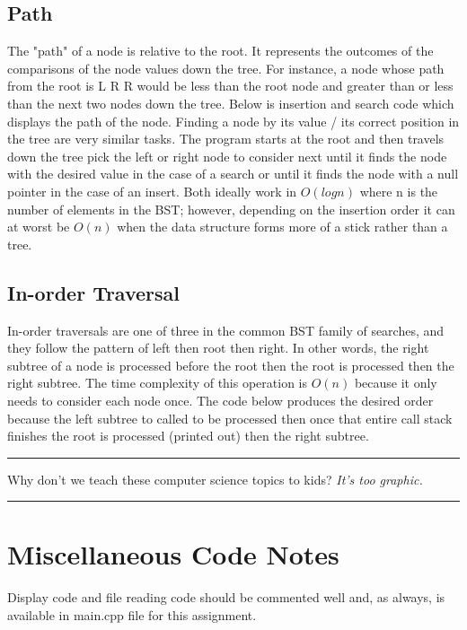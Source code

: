 \documentclass[letterpaper, 10pt]{article}
\begin{document}
\subsection{Path}
The "path" of a node is relative to the root. It represents the outcomes of the comparisons of the node values
down the tree. For instance, a node whose path from the root is L R R would be less than the root node and greater
than or less than the next two nodes down the tree. Below is insertion and search code which displays the path of 
the node. Finding a node by its value / its correct position in the tree are very similar tasks. The program
starts at the root and then travels down the tree pick the left or right node to consider next until it finds
the node with the desired value in the case of a search or until it finds the node with a null pointer in the
case of an insert.
Both ideally work in \(O(logn)\) where n is the number of elements in the BST;
however, depending on the insertion order it can at worst be \(O(n)\) when the data structure forms
more of a stick rather than a tree.



\subsection{In-order Traversal}
In-order traversals are one of three in the common BST family of searches, and they follow the pattern of
left then root then right. In other words, the right subtree of a node is processed before
the root then the root is processed then the right subtree. The time complexity of this operation is 
\(O(n)\) because it only needs to consider each node once. The code below produces the desired order because
the left subtree to called to be processed then once that entire call stack finishes the root is processed (printed out)
then the right subtree.

\vspace{.25cm}
\hrule
\vspace{.25cm}
\noindent
Why don't we teach these computer science topics to kids? \textit{It's too graphic.}
\hrule
\vspace{1cm}
\section{Miscellaneous Code Notes}
Display code and file reading code should be commented well and, as always, is available in
main.cpp file for this assignment.
\end{document}

